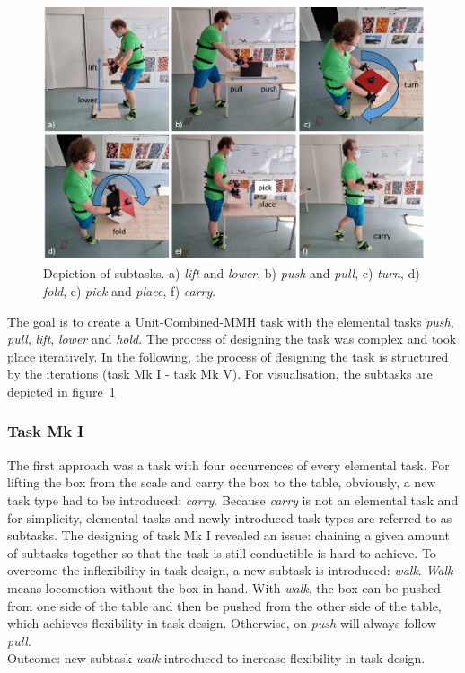 \begin{figure}[H]
	\centering
	\includegraphics[width=\textwidth]{figures/sub-tasks.png}
	\caption[Depiction of subtasks]{Depiction of subtasks. a) \textit{lift} and \textit{lower}, b) \textit{push} and \textit{pull}, c) \textit{turn}, d) \textit{fold}, e) \textit{pick} and \textit{place}, f) \textit{carry}.}
	\label{fig:sub-tasks}
\end{figure}

The goal is to create a Unit-Combined-MMH task with the elemental tasks \textit{push}, \textit{pull}, \textit{lift}, \textit{lower} and \textit{hold}. The process of designing the task was complex and took place iteratively. In the following, the process of designing the task is structured by the iterations (task Mk I - task Mk V). For visualisation, the subtasks are depicted in figure~\ref{fig:sub-tasks}\\

\subsubsection{Task Mk I}
The first approach was a task with four occurrences of every elemental task. For lifting the box from the scale and carry the box to the table, obviously, a new task type had to be introduced: \textit{carry}. Because \textit{carry} is not an elemental task and for simplicity, elemental tasks and newly introduced task types are referred to as subtasks. The designing of task Mk I revealed an issue: chaining a given amount of subtasks together so that the task is still conductible is hard to achieve. To overcome the inflexibility in task design, a new subtask is introduced: \textit{walk}. \textit{Walk} means locomotion without the box in hand. With \textit{walk}, the box can be pushed from one side of the table and then be pushed from the other side of the table, which achieves flexibility in task design. Otherwise, on \textit{push} will always follow \textit{pull}.\\
Outcome: new subtask \textit{walk} introduced to increase flexibility in task design.

